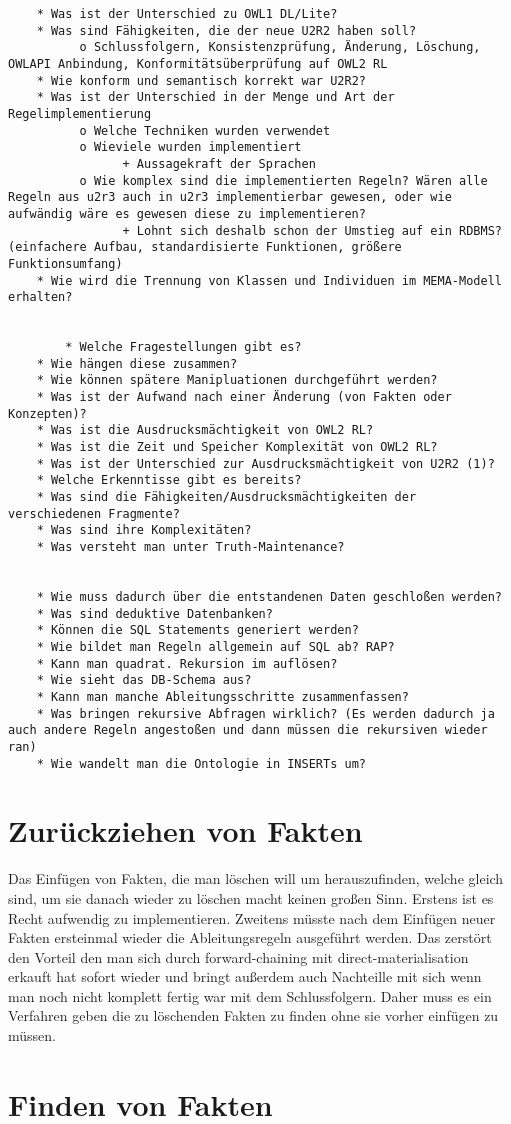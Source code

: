 \begin{verbatim}
    * Was ist der Unterschied zu OWL1 DL/Lite?
    * Was sind Fähigkeiten, die der neue U2R2 haben soll?
          o Schlussfolgern, Konsistenzprüfung, Änderung, Löschung, OWLAPI Anbindung, Konformitätsüberprüfung auf OWL2 RL 
    * Wie konform und semantisch korrekt war U2R2?
    * Was ist der Unterschied in der Menge und Art der Regelimplementierung
          o Welche Techniken wurden verwendet
          o Wieviele wurden implementiert
                + Aussagekraft der Sprachen 
          o Wie komplex sind die implementierten Regeln? Wären alle Regeln aus u2r3 auch in u2r3 implementierbar gewesen, oder wie aufwändig wäre es gewesen diese zu implementieren?
                + Lohnt sich deshalb schon der Umstieg auf ein RDBMS? (einfachere Aufbau, standardisierte Funktionen, größere Funktionsumfang) 
    * Wie wird die Trennung von Klassen und Individuen im MEMA-Modell erhalten?
    
    
        * Welche Fragestellungen gibt es?
    * Wie hängen diese zusammen?
    * Wie können spätere Manipluationen durchgeführt werden?
    * Was ist der Aufwand nach einer Änderung (von Fakten oder Konzepten)?
    * Was ist die Ausdrucksmächtigkeit von OWL2 RL?
    * Was ist die Zeit und Speicher Komplexität von OWL2 RL?
    * Was ist der Unterschied zur Ausdrucksmächtigkeit von U2R2 (1)?
    * Welche Erkenntisse gibt es bereits?
    * Was sind die Fähigkeiten/Ausdrucksmächtigkeiten der verschiedenen Fragmente?
    * Was sind ihre Komplexitäten?
    * Was versteht man unter Truth-Maintenance? 


    * Wie muss dadurch über die entstandenen Daten geschloßen werden?
    * Was sind deduktive Datenbanken?
    * Können die SQL Statements generiert werden?
    * Wie bildet man Regeln allgemein auf SQL ab? RAP?
    * Kann man quadrat. Rekursion im auflösen?
    * Wie sieht das DB-Schema aus?
    * Kann man manche Ableitungsschritte zusammenfassen?
    * Was bringen rekursive Abfragen wirklich? (Es werden dadurch ja auch andere Regeln angestoßen und dann müssen die rekursiven wieder ran)
    * Wie wandelt man die Ontologie in INSERTs um? 
\end{verbatim}


\section{Zurückziehen von Fakten}
Das Einfügen von Fakten, die man löschen will um herauszufinden, welche gleich sind, um sie danach wieder zu löschen macht keinen großen Sinn. Erstens ist es Recht aufwendig zu implementieren. Zweitens müsste nach dem Einfügen neuer Fakten ersteinmal wieder die Ableitungsregeln ausgeführt werden. Das zerstört den Vorteil den man sich durch forward-chaining mit direct-materialisation erkauft hat sofort wieder und bringt außerdem auch Nachteille mit sich wenn man noch nicht komplett fertig war mit dem Schlussfolgern.
Daher muss es ein Verfahren geben die zu löschenden Fakten zu finden ohne sie vorher einfügen zu müssen.

\section{Finden von Fakten}

